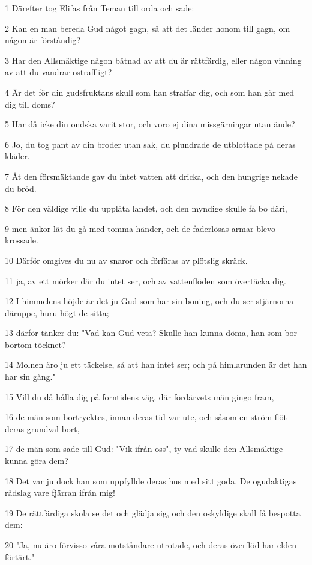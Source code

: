 \par 1 Därefter tog Elifas från Teman till orda och sade:
\par 2 Kan en man bereda Gud något gagn, så att det länder honom till gagn, om någon är förståndig?
\par 3 Har den Allsmäktige någon båtnad av att du är rättfärdig, eller någon vinning av att du vandrar ostraffligt?
\par 4 Är det för din gudsfruktans skull som han straffar dig, och som han går med dig till doms?
\par 5 Har då icke din ondska varit stor, och voro ej dina missgärningar utan ände?
\par 6 Jo, du tog pant av din broder utan sak, du plundrade de utblottade på deras kläder.
\par 7 Åt den försmäktande gav du intet vatten att dricka, och den hungrige nekade du bröd.
\par 8 För den väldige ville du upplåta landet, och den myndige skulle få bo däri,
\par 9 men änkor lät du gå med tomma händer, och de faderlösas armar blevo krossade.
\par 10 Därför omgives du nu av snaror och förfäras av plötslig skräck.
\par 11 ja, av ett mörker där du intet ser, och av vattenflöden som övertäcka dig.
\par 12 I himmelens höjde är det ju Gud som har sin boning, och du ser stjärnorna däruppe, huru högt de sitta;
\par 13 därför tänker du: "Vad kan Gud veta? Skulle han kunna döma, han som bor bortom töcknet?
\par 14 Molnen äro ju ett täckelse, så att han intet ser; och på himlarunden är det han har sin gång."
\par 15 Vill du då hålla dig på forntidens väg, där fördärvets män gingo fram,
\par 16 de män som bortrycktes, innan deras tid var ute, och såsom en ström flöt deras grundval bort,
\par 17 de män som sade till Gud: "Vik ifrån oss", ty vad skulle den Allsmäktige kunna göra dem?
\par 18 Det var ju dock han som uppfyllde deras hus med sitt goda. De ogudaktigas rådslag vare fjärran ifrån mig!
\par 19 De rättfärdiga skola se det och glädja sig, och den oskyldige skall få bespotta dem:
\par 20 "Ja, nu äro förvisso våra motståndare utrotade, och deras överflöd har elden förtärt."
